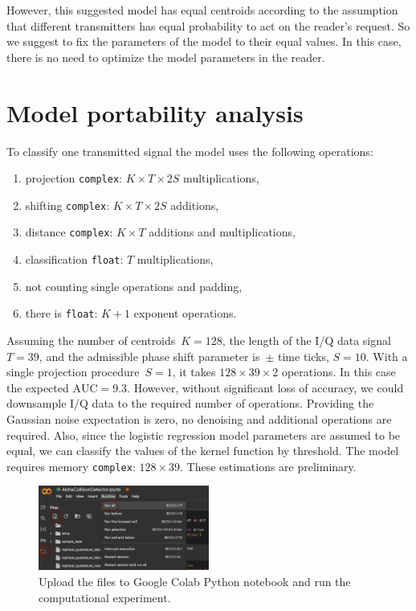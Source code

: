\documentclass[12pt]{article}
\begin{document}
However, this suggested model has equal centroids according to the assumption that different transmitters has equal probability to act on the reader's request. So we suggest to fix the parameters of the model to their equal values. In this case, there is no need to optimize the model parameters in the reader. 

\section{Model portability analysis}
To classify one transmitted signal the model uses the following operations:
\begin{enumerate}[1)]
\item projection \texttt{complex}: $K \times T \times 2S$ multiplications,
\item shifting \texttt{complex}: $K \times T \times 2S$ additions,
\item distance  \texttt{complex}: $K \times T$ additions and multiplications,
\item classification \texttt{float}: $T$  multiplications,
\item not counting single operations and padding,
\item there is \texttt{float}: $K+1$ exponent operations.
\end{enumerate}
Assuming the number of centroids~$K=128$, the length of the I/Q data signal $T=39$, and the admissible phase shift parameter is~$\pm$ time ticks, $S=10$. %
With a single projection procedure~$S=1$, it takes $128\times 39 \times 2$ operations. In this case the expected \mbox{$\text{AUC}=9.3$}. However, without significant loss of accuracy, we could downsample I/Q data to the required number of operations. Providing the Gaussian noise expectation is zero, no denoising and additional operations are required. Also, since the logistic regression model parameters are assumed to be equal, we can classify the values of the kernel function by threshold. 
The model requires memory \texttt{complex}: $128\times 39$. %
These estimations are preliminary. 


\begin{figure}[!h]
\centering
\includegraphics[width=0.5\textwidth]{fig_demo_upload}
\caption{Upload the files to Google Colab Python notebook and run the computational experiment.}
\label{fig:demo}
\end{figure}
\end{document}
